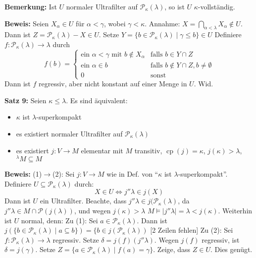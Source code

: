 \documentclass[a4paper,fontsize=11pt]{scrartcl}
\newcommand{\cp}{\operatorname{cp}}
\begin{document}
{\bf Bemerkung:} Ist $U$ normaler Ultrafilter auf $\mathcal P_{\kappa}(\lambda)$, so ist $U$ $\kappa$-vollständig.

	{\bf Beweis:} Seien $X_{\alpha}\in U$ für $\alpha<\gamma$, wobei $\gamma<\kappa$.
		Annahme: $X=\bigcap_{\alpha<\lambda} X_{\alpha}\not\in U$.
		Dann ist $Z=\mathcal P_{\kappa}(\lambda)-X\in U$.
		Setze $Y=\{b\in \mathcal P_{\kappa}(\lambda)\mid \gamma\le b\}\in U$
		Definiere $f\colon \mathcal P_{\kappa}(\lambda)\to \lambda$ durch 
		\[ f(b)=\left\{ \begin{array}{cl} \mbox{ein $\alpha<\gamma$ mit }b\not\in X_\alpha & \mbox{falls }b\in Y\cap Z \\
						\mbox{ein }\alpha\in b & \mbox{falls }b\not\in Y\cap Z, b\neq\emptyset \\
						0 & \mbox{sonst}  \end{array}\right.\]
		Dann ist $f$ regressiv, aber nicht konstant auf einer Menge in $U$. Wid.


{\bf Satz 9:} Seien $\kappa\le\lambda$.
	Es sind äquivalent: \begin{itemize}
		\item $\kappa$ ist $\lambda$-superkompakt
		\item es existiert normaler Ultrafilter auf $\mathcal P_{\kappa}(\lambda)$
		\item es existiert $j\colon V\to M$ elementar mit $M$ transitiv, $\cp(j)=\kappa$, $j(\kappa)>\lambda$, $^\lambda M\subseteq M$
	\end{itemize}

	{\bf Beweis:} (1)$\to$(2): Sei $j\colon V\to M$ wie in Def. von ``$\kappa$ ist $\lambda$-superkompakt''.
		Definiere $U\subseteq\mathcal P_{\kappa}(\lambda)$ durch:
		\[ X\in U\iff j''\lambda\in j(X)\]
		Dann ist $U$ ein Ultrafilter.
		Beachte, dass $j''\lambda\in j(\mathcal P_{\kappa}(\lambda)$, da $j''\lambda\in M\cap \mathcal P(j(\lambda))$, und wegen $j(\kappa)>\lambda$ $M\models|j''\lambda|=\lambda<j(\kappa)$.
		Weiterhin ist $U$ normal, denn: Zu (1): Sei $a\in \mathcal P_{\kappa}(\lambda)$.
		Dann ist $j(\{b\in \mathcal P_{\kappa}(\lambda)\mid a\subseteq b\})=\{b\in j(\mathcal P_{\kappa}(\lambda))$
		[2 Zeilen fehlen] %
		Zu (2): Sei $f\colon\mathcal P_\kappa(\lambda)\to\lambda$ regressiv.
		Setze $\delta=j(f)(j''\lambda)$.
		Wegen $j(f)$ regressiv, ist $\delta=j(\gamma)$.
		Setze $Z=\{a\in\mathcal P_\kappa(\lambda)\mid f(a)=\gamma\}$.
		Zeige, dass $Z\in U$. Dies genügt.
\end{document}
